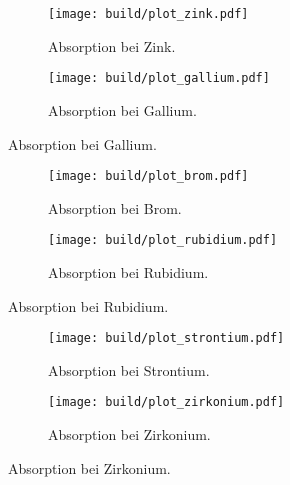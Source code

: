   \begin{figure}
    \centering
    \begin{subfigure}{0.30\textwidth}
      \centering
      \texttt{[image: build/plot\_zink.pdf]}
      \caption{Absorption bei Zink.}
      \label{fig:zink}
    \end{subfigure}
    \hfill
    \begin{subfigure}{0.30\textwidth}
      \centering
      \texttt{[image: build/plot\_gallium.pdf]}
      \caption{Absorption bei Gallium.}
      \label{fig:gallium}
    \end{subfigure}
  \end{figure}

  \begin{figure}
    \centering
    \begin{subfigure}{0.30\textwidth}
      \centering
      \texttt{[image: build/plot\_brom.pdf]}
      \caption{Absorption bei Brom.}
      \label{fig:brom}
    \end{subfigure}
    \hfill
    \begin{subfigure}{0.30\textwidth}
      \centering
      \texttt{[image: build/plot\_rubidium.pdf]}
      \caption{Absorption bei Rubidium.}
      \label{fig:rubidium}
    \end{subfigure}
  \end{figure}

  \begin{figure}
    \centering
    \begin{subfigure}{0.30\textwidth}
      \texttt{[image: build/plot\_strontium.pdf]}
      \caption{Absorption bei Strontium.}
      \label{fig:strontium}
    \end{subfigure}
    \hfill
    \begin{subfigure}{0.30\textwidth}
      \texttt{[image: build/plot\_zirkonium.pdf]}
      \caption{Absorption bei Zirkonium.}
      \label{fig:zirkonium}
    \end{subfigure}
  \end{figure}

  \FloatBarrier

